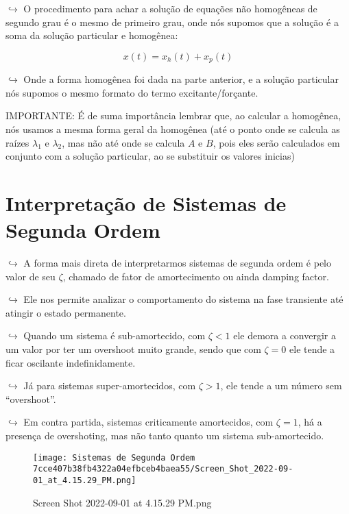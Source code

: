 \documentclass{article}
\begin{document}
\begin{itemize}
\(\hookrightarrow\) O procedimento para achar a solução de equações não
homogêneas de segundo grau é o mesmo de primeiro grau, onde nós supomos
que a solução é a soma da solução particular e homogênea:

\[
x(t) = x_h(t) + x_p(t)
\]

\(\hookrightarrow\) Onde a forma homogênea foi dada na parte anterior, e
a solução particular nós supomos o mesmo formato do termo
excitante/forçante.

IMPORTANTE: É de suma importância lembrar que, ao calcular a homogênea,
nós usamos a mesma forma geral da homogênea (até o ponto onde se calcula
as raízes \(\lambda_1\) e \(\lambda_2\), mas não até onde se calcula
\(A\) e \(B\), pois eles serão calculados em conjunto com a solução
particular, ao se substituir os valores inicias)

\hypertarget{interpretauxe7uxe3o-de-sistemas-de-segunda-ordem}{%
\section{Interpretação de Sistemas de Segunda
Ordem}\label{interpretauxe7uxe3o-de-sistemas-de-segunda-ordem}}

\(\hookrightarrow\) A forma mais direta de interpretarmos sistemas de
segunda ordem é pelo valor de seu \(\zeta\), chamado de fator de
amortecimento ou ainda damping factor.

\(\hookrightarrow\) Ele nos permite analizar o comportamento do sistema
na fase transiente até atingir o estado permanente.

\(\hookrightarrow\) Quando um sistema é sub-amortecido, com
\(\zeta < 1\) ele demora a convergir a um valor por ter um overshoot
muito grande, sendo que com \(\zeta = 0\) ele tende a ficar oscilante
indefinidamente.

\(\hookrightarrow\) Já para sistemas super-amortecidos, com
\(\zeta > 1\), ele tende a um número sem ``overshoot''.

\(\hookrightarrow\) Em contra partida, sistemas criticamente
amortecidos, com \(\zeta = 1\), há a presença de overshoting, mas não
tanto quanto um sistema sub-amortecido.

\begin{figure}
\centering
\texttt{[image: Sistemas de Segunda Ordem 7cce407b38fb4322a04efbceb4baea55/Screen\_Shot\_2022-09-01\_at\_4.15.29\_PM.png]}
\caption{Screen Shot 2022-09-01 at 4.15.29 PM.png}
\end{figure}

\hypertarget{transformada-de-laplace}{%
}
\end{itemize}
\end{document}
